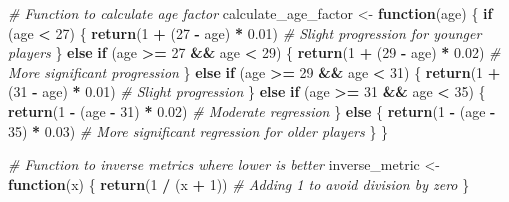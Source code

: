 \documentclass[
]{article}
\newenvironment{Shaded}{\begin{snugshade}}{\end{snugshade}}
\newcommand{\CommentTok}[1]{\textcolor[rgb]{0.56,0.35,0.01}{\textit{#1}}}
\newcommand{\ControlFlowTok}[1]{\textcolor[rgb]{0.13,0.29,0.53}{\textbf{#1}}}
\newcommand{\DecValTok}[1]{\textcolor[rgb]{0.00,0.00,0.81}{#1}}
\newcommand{\FloatTok}[1]{\textcolor[rgb]{0.00,0.00,0.81}{#1}}
\newcommand{\FunctionTok}[1]{\textcolor[rgb]{0.13,0.29,0.53}{\textbf{#1}}}
\newcommand{\NormalTok}[1]{#1}
\newcommand{\OtherTok}[1]{\textcolor[rgb]{0.56,0.35,0.01}{#1}}
\newcommand{\SpecialCharTok}[1]{\textcolor[rgb]{0.81,0.36,0.00}{\textbf{#1}}}
\begin{document}
\begin{Shaded}
\begin{Highlighting}[]
\CommentTok{\# Function to calculate age factor}
\NormalTok{calculate\_age\_factor }\OtherTok{\textless{}{-}} \ControlFlowTok{function}\NormalTok{(age) \{}
  \ControlFlowTok{if}\NormalTok{ (age }\SpecialCharTok{\textless{}} \DecValTok{27}\NormalTok{) \{}
    \FunctionTok{return}\NormalTok{(}\DecValTok{1} \SpecialCharTok{+}\NormalTok{ (}\DecValTok{27} \SpecialCharTok{{-}}\NormalTok{ age) }\SpecialCharTok{*} \FloatTok{0.01}\NormalTok{)  }\CommentTok{\# Slight progression for younger players}
\NormalTok{  \} }\ControlFlowTok{else} \ControlFlowTok{if}\NormalTok{ (age }\SpecialCharTok{\textgreater{}=} \DecValTok{27} \SpecialCharTok{\&\&}\NormalTok{ age }\SpecialCharTok{\textless{}} \DecValTok{29}\NormalTok{) \{}
    \FunctionTok{return}\NormalTok{(}\DecValTok{1} \SpecialCharTok{+}\NormalTok{ (}\DecValTok{29} \SpecialCharTok{{-}}\NormalTok{ age) }\SpecialCharTok{*} \FloatTok{0.02}\NormalTok{)  }\CommentTok{\# More significant progression}
\NormalTok{  \} }\ControlFlowTok{else} \ControlFlowTok{if}\NormalTok{ (age }\SpecialCharTok{\textgreater{}=} \DecValTok{29} \SpecialCharTok{\&\&}\NormalTok{ age }\SpecialCharTok{\textless{}} \DecValTok{31}\NormalTok{) \{}
    \FunctionTok{return}\NormalTok{(}\DecValTok{1} \SpecialCharTok{+}\NormalTok{ (}\DecValTok{31} \SpecialCharTok{{-}}\NormalTok{ age) }\SpecialCharTok{*} \FloatTok{0.01}\NormalTok{)  }\CommentTok{\# Slight progression}
\NormalTok{  \} }\ControlFlowTok{else} \ControlFlowTok{if}\NormalTok{ (age }\SpecialCharTok{\textgreater{}=} \DecValTok{31} \SpecialCharTok{\&\&}\NormalTok{ age }\SpecialCharTok{\textless{}} \DecValTok{35}\NormalTok{) \{}
    \FunctionTok{return}\NormalTok{(}\DecValTok{1} \SpecialCharTok{{-}}\NormalTok{ (age }\SpecialCharTok{{-}} \DecValTok{31}\NormalTok{) }\SpecialCharTok{*} \FloatTok{0.02}\NormalTok{)  }\CommentTok{\# Moderate regression}
\NormalTok{  \} }\ControlFlowTok{else}\NormalTok{ \{}
    \FunctionTok{return}\NormalTok{(}\DecValTok{1} \SpecialCharTok{{-}}\NormalTok{ (age }\SpecialCharTok{{-}} \DecValTok{35}\NormalTok{) }\SpecialCharTok{*} \FloatTok{0.03}\NormalTok{)  }\CommentTok{\# More significant regression for older players}
\NormalTok{  \}}
\NormalTok{\}}
\end{Highlighting}
\end{Shaded}

\begin{Shaded}
\begin{Highlighting}[]
\CommentTok{\# Function to inverse metrics where lower is better}
\NormalTok{inverse\_metric }\OtherTok{\textless{}{-}} \ControlFlowTok{function}\NormalTok{(x) \{}
  \FunctionTok{return}\NormalTok{(}\DecValTok{1} \SpecialCharTok{/}\NormalTok{ (x }\SpecialCharTok{+} \DecValTok{1}\NormalTok{))  }\CommentTok{\# Adding 1 to avoid division by zero}
\NormalTok{\}}
\end{Highlighting}
\end{Shaded}
\end{document}

